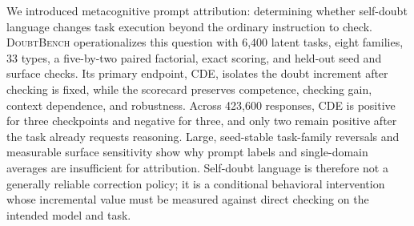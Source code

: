 \documentclass[sigconf]{acmart}
\newcommand{\bench}{\textsc{DoubtBench}}
\newcommand{\revision}[1]{\textcolor{revisionred}{#1}}
\begin{document}
We introduced metacognitive prompt attribution: determining whether
self-doubt language changes task execution beyond the ordinary instruction to
check. \bench{} operationalizes this question with 6,400 latent tasks, eight
families, 33 types, a five-by-two paired factorial, exact scoring, and held-out
seed and surface checks. Its primary endpoint, CDE, isolates the doubt
increment after checking is fixed, while the scorecard preserves competence,
checking gain, context dependence, and robustness. \revision{Across 423,600
responses, CDE is positive for three checkpoints and negative for three, and
only two remain positive after the task already requests reasoning. Large,
seed-stable task-family reversals and measurable surface sensitivity show why
prompt labels and single-domain averages are insufficient for attribution.
Self-doubt language is therefore not a generally reliable correction policy;
it is a conditional behavioral intervention whose incremental value must be
measured against direct checking on the intended model and task.}



\end{document}
